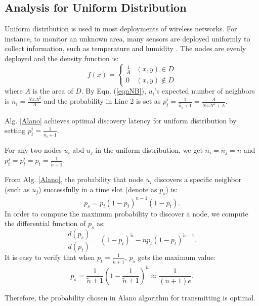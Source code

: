 \subsection{Analysis for Uniform Distribution}
\label{uniform}
Uniform distribution is used in most deployments of wireless networks.
For instance, to monitor an unknown area, many sensors are deployed
uniformly to collect information, such as temperature and humidity
\cite{flammini2007real}. The nodes are evenly deployed and the density
function is:
$$f(x)=
\begin{cases}
\frac{1}{A}& (x,y)\in D\\
0& (x,y)\notin D
\end{cases}$$
where $A$ is the area of $D$.
By Eqn. (\ref{eqnNB}), $u_i$'s expected number of neighbors is $\widetilde{n_i} = \frac{N\pi \Delta^2}{A}$ and the probability in Line 2 is set as $p_t^i = \frac{1}{\widetilde{n_i}+1}=\frac{A}{N\pi \Delta^2+A}$. 
\begin{lemma}
Alg. \ref{Alano} achieves optimal discovery latency for uniform distribution by setting $p_t^i = \frac{1}{\widetilde{n_i}+1}$.
\end{lemma}
\begin{IEEEproof}
For any two nodes $u_i$ abd $u_j$ in the uniform distribution, we get $\widetilde{n_i} = \widetilde{n_j} = \widetilde{n}$ and $p_t^j = p_t^ i = p_t = \frac{1}{\widetilde{n}+1}$.


From Alg. \ref{Alano}, the probability that node $u_i$ discovers a specific neighbor (such as $u_j$) successfully in a time slot (denote as $p_s$) is:
$$
p_s = p_t{(1-p_t)}^{\widetilde{n}-1}(1-p_t).
$$
In order to compute the maximum probability to discover a node, we compute the differential function of $p_s$ as:
$$
\frac{d(p_s)}{d(p_t)} = {(1-p_t)}^{\widetilde{n}}-\widetilde{n}p_t{(1-p_t)}^{\widetilde{n}-1}.
$$
It is easy to verify that when $p_t=\frac{1}{\widetilde{n}+1}$, $p_s$ gets the maximum value:
$$p_s = \frac{1}{\widetilde{n}+1}{(1-\frac{1}{\widetilde{n}+1})}^{\widetilde{n}} \approx \frac{1}{(\widetilde{n}+1)e}.$$

Therefore, the probability chosen in Alano algorithm for transmitting is optimal.
\end{IEEEproof}



